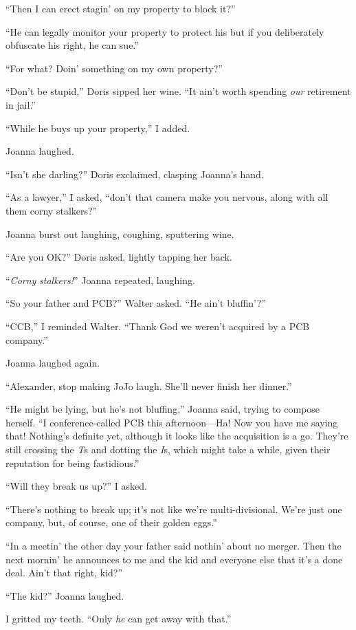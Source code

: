 ``Then I can erect stagin' on my property to block it?''

``He can legally monitor your property to protect his but if you
deliberately obfuscate his right, he can sue.''

``For what? Doin' something on my own property?''

``Don't be stupid,'' Doris sipped her wine. ``It ain't worth spending
\emph{our} retirement in jail.''

``While he buys up your property,'' I added.

Joanna laughed.

``Isn't she darling?'' Doris exclaimed, clasping Joanna's hand.

``As a lawyer,'' I asked, ``don't that camera make you nervous, along
with all them corny stalkers?''

Joanna burst out laughing, coughing, sputtering wine.

``Are you OK?'' Doris asked, lightly tapping her back.

``\emph{Corny} \emph{stalkers!}'' Joanna repeated, laughing.

``So your father and PCB?'' Walter asked. ``He ain't bluffin'?''

``CCB,'' I reminded Walter. ``Thank God we weren't acquired by a PCB
company.''

Joanna laughed again.

``Alexander, stop making JoJo laugh. She'll never finish her dinner.''

``He might be lying, but he's not bluffing,'' Joanna said, trying to
compose herself. ``I conference-called PCB this afternoon---Ha! Now you
have me saying that! Nothing's definite yet, although it looks like the
acquisition is a go. They're still crossing the \emph{T}s and dotting
the \emph{I}s, which might take a while, given their reputation for
being fastidious.''

``Will they break us up?'' I asked.

``There's nothing to break up; it's not like we're multi-divisional.
We're just one company, but, of course, one of their golden eggs.''

``In a meetin' the other day your father said nothin' about no merger.
Then the next mornin' he announces to me and the kid and everyone else
that it's a done deal. Ain't that right, kid?''

``The kid?'' Joanna laughed.

I gritted my teeth. ``Only \emph{he} can get away with that.''

